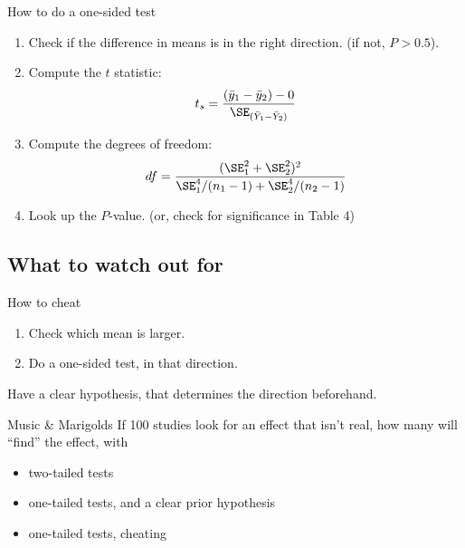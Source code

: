 \begin{frame}{How to do a one-sided test}

  \begin{center}
  \end{center}

  \vspace{-1em}

  \begin{enumerate}
    \item Check if the difference in means is in the right direction. (if not, $P>0.5$).

    \item Compute the $t$ statistic:
      \[
          t_s = \frac{ (\bar y_1 - \bar y_2) - 0}{ \SE_{(\bar Y_1 - \bar Y_2)} }
      \]

    \item Compute the degrees of freedom:
        \[
            df = \frac{ (\SE_1^2 + \SE_2^2)^2 }{ \SE_1^4 / (n_1-1) + \SE_2^4 / (n_2 - 1) }
        \]

    \item Look up the $P$-value. (or, check for significance in Table 4)

  \end{enumerate}


\end{frame}

\subsection{What to watch out for}

%
\begin{frame}{How to cheat}

  \begin{enumerate}
    \item Check which mean is larger.
    \item Do a one-sided test, in that direction.
  \end{enumerate}

  \vspace{2em}

   Have a clear hypothesis, that determines the direction beforehand.

  \vspace{2em}

  \begin{block}{Music \& Marigolds}
    If 100 studies look for an effect that isn't real, 
    how many will ``find'' the effect, with
    \begin{itemize}
      \item[\bf (a)] two-tailed tests
      \item[\bf (b)] one-tailed tests, and a clear prior hypothesis
      \item[\bf (c)] one-tailed tests, cheating
    \end{itemize}
  \end{block}

\end{frame}


